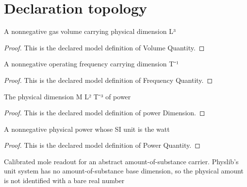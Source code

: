 \section{Declaration topology}
\begin{definition}
  \label{def:physics:phyx-mini-0481:phyxminiproblems-problemphyxmini0481-volumequantity}
  A nonnegative gas volume carrying physical dimension L³
\end{definition}
\begin{proof}
  This is the declared model definition of Volume Quantity.
\end{proof}
\begin{definition}
  \label{def:physics:phyx-mini-0481:phyxminiproblems-problemphyxmini0481-frequencyquantity}
  A nonnegative operating frequency carrying dimension T⁻¹
\end{definition}
\begin{proof}
  This is the declared model definition of Frequency Quantity.
\end{proof}
\begin{definition}
  \label{def:physics:phyx-mini-0481:phyxminiproblems-problemphyxmini0481-powerdimension}
  The physical dimension M L² T⁻³ of power
\end{definition}
\begin{proof}
  This is the declared model definition of power Dimension.
\end{proof}
\begin{definition}
  \label{def:physics:phyx-mini-0481:phyxminiproblems-problemphyxmini0481-powerquantity}
  A nonnegative physical power whose SI unit is the watt
\end{definition}
\begin{proof}
  This is the declared model definition of Power Quantity.
\end{proof}
\begin{definition}
  \label{def:physics:phyx-mini-0481:phyxminiproblems-problemphyxmini0481-molarmeasurement}
  Calibrated mole readout for an abstract amount-of-substance carrier. Physlib's unit system has no amount-of-substance base dimension, so the physical amount is not identified with a bare real number
\end{definition}
